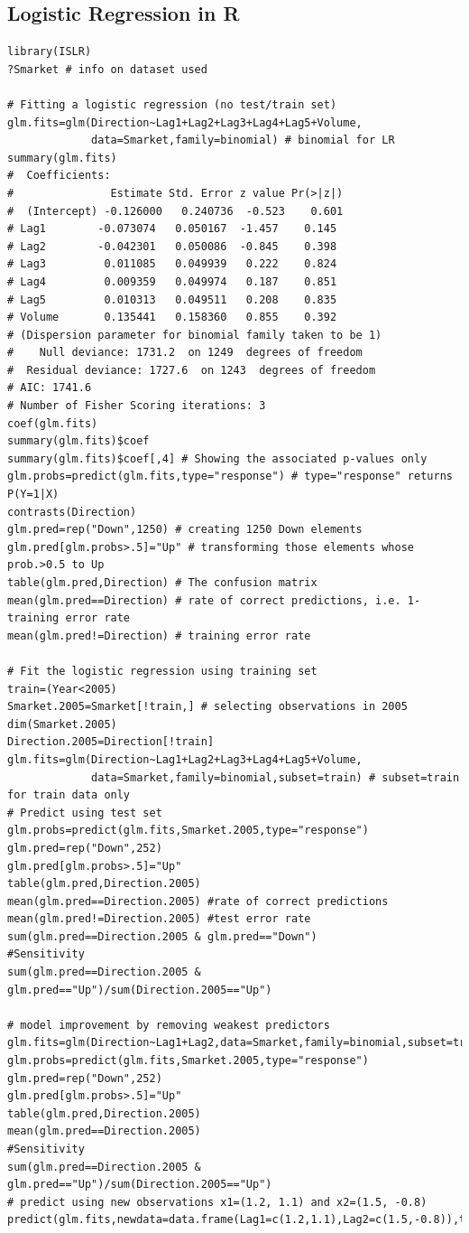 \documentclass[11pt]{article}
\begin{document}
\subsection{Logistic Regression in R}
\begin{lstlisting}
library(ISLR)
?Smarket # info on dataset used

# Fitting a logistic regression (no test/train set)
glm.fits=glm(Direction~Lag1+Lag2+Lag3+Lag4+Lag5+Volume,
             data=Smarket,family=binomial) # binomial for LR
summary(glm.fits)
#  Coefficients:
#               Estimate Std. Error z value Pr(>|z|)
#  (Intercept) -0.126000   0.240736  -0.523    0.601
# Lag1        -0.073074   0.050167  -1.457    0.145
# Lag2        -0.042301   0.050086  -0.845    0.398
# Lag3         0.011085   0.049939   0.222    0.824
# Lag4         0.009359   0.049974   0.187    0.851
# Lag5         0.010313   0.049511   0.208    0.835
# Volume       0.135441   0.158360   0.855    0.392
# (Dispersion parameter for binomial family taken to be 1)
#    Null deviance: 1731.2  on 1249  degrees of freedom
#  Residual deviance: 1727.6  on 1243  degrees of freedom
# AIC: 1741.6
# Number of Fisher Scoring iterations: 3
coef(glm.fits)
summary(glm.fits)$coef
summary(glm.fits)$coef[,4] # Showing the associated p-values only
glm.probs=predict(glm.fits,type="response") # type="response" returns P(Y=1|X)
contrasts(Direction)
glm.pred=rep("Down",1250) # creating 1250 Down elements
glm.pred[glm.probs>.5]="Up" # transforming those elements whose prob.>0.5 to Up
table(glm.pred,Direction) # The confusion matrix
mean(glm.pred==Direction) # rate of correct predictions, i.e. 1-training error rate
mean(glm.pred!=Direction) # training error rate

# Fit the logistic regression using training set
train=(Year<2005)
Smarket.2005=Smarket[!train,] # selecting observations in 2005
dim(Smarket.2005)
Direction.2005=Direction[!train]
glm.fits=glm(Direction~Lag1+Lag2+Lag3+Lag4+Lag5+Volume,
             data=Smarket,family=binomial,subset=train) # subset=train for train data only
# Predict using test set
glm.probs=predict(glm.fits,Smarket.2005,type="response")
glm.pred=rep("Down",252)
glm.pred[glm.probs>.5]="Up"
table(glm.pred,Direction.2005)
mean(glm.pred==Direction.2005) #rate of correct predictions
mean(glm.pred!=Direction.2005) #test error rate
sum(glm.pred==Direction.2005 & glm.pred=="Down")
#Sensitivity
sum(glm.pred==Direction.2005 & glm.pred=="Up")/sum(Direction.2005=="Up")

# model improvement by removing weakest predictors
glm.fits=glm(Direction~Lag1+Lag2,data=Smarket,family=binomial,subset=train)
glm.probs=predict(glm.fits,Smarket.2005,type="response")
glm.pred=rep("Down",252)
glm.pred[glm.probs>.5]="Up"
table(glm.pred,Direction.2005)
mean(glm.pred==Direction.2005)
#Sensitivity
sum(glm.pred==Direction.2005 & glm.pred=="Up")/sum(Direction.2005=="Up")
# predict using new observations x1=(1.2, 1.1) and x2=(1.5, -0.8)
predict(glm.fits,newdata=data.frame(Lag1=c(1.2,1.1),Lag2=c(1.5,-0.8)),type="response")
\end{lstlisting}
\end{document}
